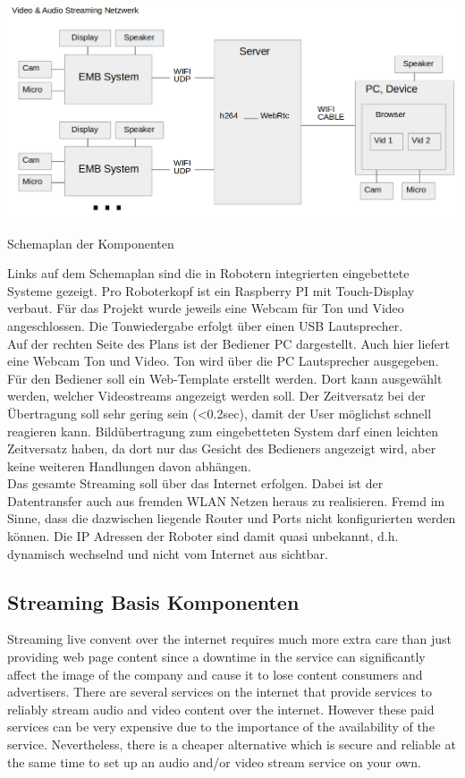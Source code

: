 \begin{minipage}{\textwidth}
    \begin{center}        
        \includegraphics[scale=0.4]{img/schemaproj.png} 
    \end{center}
\end{minipage}
\begin{center}
Schemaplan der Komponenten
\end{center}
Links auf dem Schemaplan sind die in Robotern integrierten eingebettete Systeme gezeigt. Pro Roboterkopf ist ein Raspberry PI mit Touch-Display verbaut. Für das Projekt wurde jeweils eine Webcam für Ton und Video angeschlossen. Die Tonwiedergabe erfolgt über einen USB Lautsprecher. \\
Auf der rechten Seite des Plans ist der Bediener PC dargestellt. Auch hier liefert eine Webcam Ton und Video. Ton wird über die PC Lautsprecher ausgegeben.\\
Für den Bediener soll ein Web-Template erstellt werden. Dort kann ausgewählt werden, welcher Videostreams angezeigt werden soll. Der Zeitversatz bei der Übertragung soll sehr gering sein 
(<0.2sec), damit der User möglichst schnell reagieren kann. Bildübertragung zum eingebetteten System darf einen leichten Zeitversatz haben, da dort nur das Gesicht des Bedieners angezeigt wird, aber keine weiteren Handlungen davon abhängen.\\
Das gesamte Streaming soll über das Internet erfolgen. Dabei ist der Datentransfer auch aus 
fremden WLAN Netzen heraus zu realisieren. Fremd im Sinne, dass die dazwischen liegende Router und Ports nicht konfigurierten werden können. Die IP Adressen der Roboter sind damit quasi unbekannt, d.h. dynamisch wechselnd und nicht vom Internet aus sichtbar.\\
 

\subsection{Streaming Basis Komponenten}
Streaming live convent over the internet requires much more extra care than just providing web page content since a downtime in the service can significantly affect the image of the company and cause it to lose content consumers and advertisers. There are several services on the internet that provide services to reliably stream audio and video content over the internet. However these paid services can be very expensive due to the importance of the availability of the service. Nevertheless, there is a cheaper alternative which is secure and reliable at the same time to set up an audio and/or video stream service on your own.

